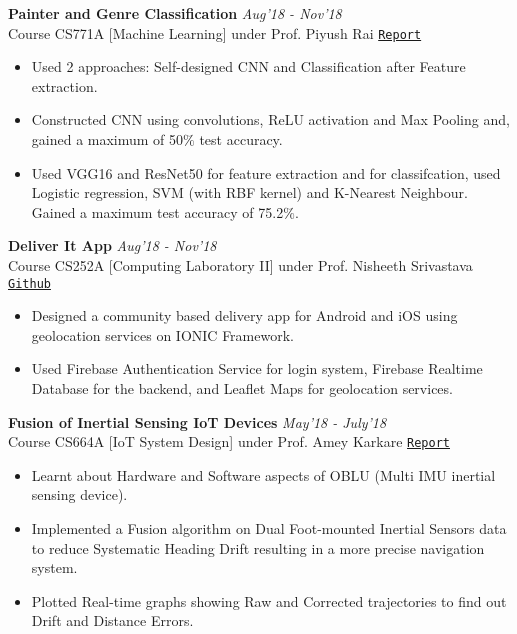 \documentclass[10pt]{extarticle}
\begin{document}
\vspace{2mm}
\textbf{Painter and Genre Classification}
\hfill\hfill\textit{Aug'18 - Nov'18}\\
Course CS771A [Machine Learning] under Prof. Piyush Rai
\hfill
\href{https://drive.google.com/open?id=1z7EHuB3JJIuZX8bsxXrjmLi5mLkdwaBF}{\texttt{Report}}
\begin{itemize}
\renewcommand\labelitemi{--}
\item Used 2 approaches: Self-designed CNN and Classification after Feature extraction.
\item Constructed CNN using convolutions, ReLU activation and Max Pooling and, gained a maximum of 50$\%$ test accuracy.
\item Used VGG16 and ResNet50 for feature extraction and for classifcation, used Logistic regression, SVM (with RBF kernel) and K-Nearest Neighbour. Gained a maximum test accuracy of 75.2$\%$.
\end{itemize}
\vspace{2mm}
\textbf{Deliver It App}
\hfill\hfill\textit{Aug'18 - Nov'18}\\
Course CS252A [Computing Laboratory II] under Prof. Nisheeth Srivastava
\hfill
\href{https://github.com/SahilDhull/252_project}{\texttt{Github}}
\begin{itemize}
\renewcommand\labelitemi{--}
\item Designed a community based delivery app for Android and iOS using geolocation services on IONIC Framework.
\item Used Firebase Authentication Service for login system, Firebase Realtime Database for the backend, and Leaflet Maps for geolocation services.
\end{itemize}
\vspace{2mm}
\textbf{Fusion of Inertial Sensing IoT Devices} \hfill\hfill\textit{May'18 - July'18}\\
Course CS664A [IoT System Design] under Prof. Amey Karkare
\hfill
\href{https://drive.google.com/open?id=1Ke4T3OCpIyz1n92X255i7DAlqgbJZLXJ}{\texttt{Report}}
\begin{itemize}
\renewcommand\labelitemi{--}
\item Learnt about Hardware and Software aspects of OBLU (Multi IMU inertial sensing device).
\item Implemented a Fusion algorithm on Dual Foot-mounted Inertial Sensors data to reduce Systematic Heading Drift resulting in a more precise navigation system.
\item Plotted Real-time graphs showing Raw and Corrected trajectories to find out Drift and Distance Errors.
\end{itemize}
\end{document}

